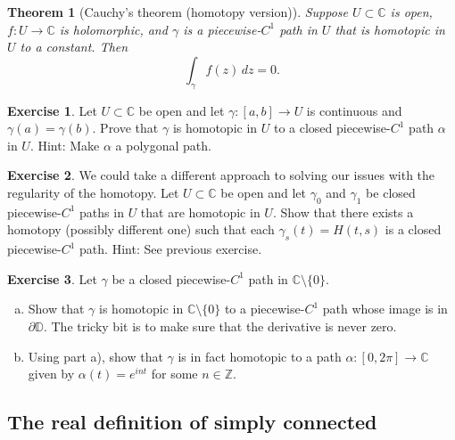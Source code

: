 \documentclass[12pt,openany]{book}
\newcommand{\C}{{\mathbb{C}}}
\newcommand{\Z}{{\mathbb{Z}}}
\newcommand{\D}{{\mathbb{D}}}
\theoremstyle{plain}
\newtheorem{thm}{Theorem}[section]
\theoremstyle{remark}
\theoremstyle{definition}
\newenvironment{exbox}{%
    \def\FrameCommand{\vrule width 1pt \relax\hspace{10pt}}%
    \MakeFramed{\advance\hsize-\width\FrameRestore}%
}{%
    \endMakeFramed
}
\newenvironment{exparts}{%
    \leavevmode\begin{enumerate}[a),noitemsep,topsep=0pt,parsep=0pt,partopsep=0pt]
}{%
    \end{enumerate}
}
\theoremstyle{exercise}
\newtheorem{exercise}{Exercise}[section]
\theoremstyle{example}
\begin{document}
\begin{thm}[Cauchy's theorem (homotopy version)]
\label{thm:cauchyhomotopy}%
%
Suppose $U \subset \C$ is open, $f \colon U \to \C$ is holomorphic,
and $\gamma$ is a piecewise-$C^1$ path in $U$ that is homotopic in $U$ to a
constant.  Then
\begin{equation*}
\int_{\gamma} f(z) \, dz = 0 .
\end{equation*}
\end{thm}

\begin{exbox}
\begin{exercise}
Let $U \subset \C$ be open and let $\gamma \colon [a,b] \to U$ is continuous
and $\gamma(a)=\gamma(b)$.  Prove that $\gamma$ is homotopic in $U$
to a closed piecewise-$C^1$ path $\alpha$ in $U$.
Hint: Make $\alpha$ a polygonal path.
\end{exercise}

\begin{exercise}
We could take a different approach to solving our issues with the regularity
of the homotopy.  Let
$U \subset \C$ be open and let $\gamma_0$ and $\gamma_1$ be closed
piecewise-$C^1$ paths in $U$ that are homotopic in $U$.
Show that there exists a homotopy (possibly different one) such that
each $\gamma_s(t) = H(t,s)$ is a closed piecewise-$C^1$ path.
Hint: See previous exercise.
\end{exercise}

\begin{exercise}
\pagebreak[2]
Let $\gamma$ be a closed piecewise-$C^1$ path in $\C \setminus \{ 0 \}$.
\begin{exparts}
\item
Show that $\gamma$ is homotopic in $\C \setminus \{ 0 \}$ to
a piecewise-$C^1$ path whose image is in $\partial \D$.
The tricky bit is to make sure that the derivative is never zero.
\item
Using part a),
show that $\gamma$ is in fact homotopic to a path
$\alpha \colon [0,2\pi] \to \C$ given by $\alpha(t) = e^{int}$ for some
$n \in \Z$.
\end{exparts}
\end{exercise}
\end{exbox}

\subsection{The real definition of simply connected}
\end{document}
